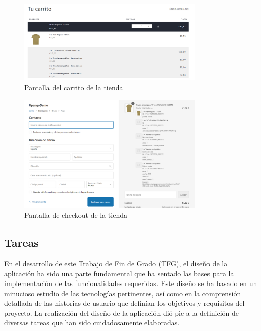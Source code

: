 \documentclass[11pt]{article}
\begin{document}
\begin{figure}[H]
    \centering
    \includegraphics[width=0.8\textwidth]{imagenes/ManualUsuario/PantallaCarrito.png}
    \caption{\label{fig:Carrito}Pantalla del carrito de la tienda}
    \vspace{\fill}
\end{figure}

\begin{figure}[H]
    \centering
    \includegraphics[width=0.8\textwidth]{imagenes/ManualUsuario/ImagenCheckout.png}
    \caption{\label{fig:Checkout}Pantalla de checkout de la tienda}
    \vspace{\fill}
\end{figure}

\clearpage
\subsection{Tareas}\label{sec:tareas}

En el desarrollo de este Trabajo de Fin de Grado (TFG), el diseño de la aplicación ha sido una parte fundamental que ha sentado las bases para la implementación
de las funcionalidades requeridas. Este diseño se ha basado en un minucioso estudio de las tecnologías pertinentes, así como en la comprensión detallada de las
historias de usuario que definían los objetivos y requisitos del proyecto. La realización del diseño de la aplicación dió pie a la definición de diversas tareas que han sido cuidadosamente 
elaboradas.
\end{document}
